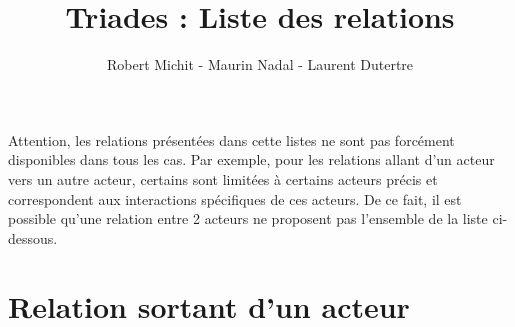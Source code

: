\documentclass[8pt,a4paper]{article}
\title{Triades : Liste des relations}
\author{Robert Michit - Maurin Nadal - Laurent Dutertre}
\begin{document}
\maketitle

\tableofcontents 
\vspace{30 pt}

Attention, les relations présentées dans cette listes ne sont pas forcément disponibles dans tous les cas. Par exemple, pour les relations allant d'un acteur vers un autre acteur, certains sont limitées à certains acteurs précis et correspondent aux interactions spécifiques de ces acteurs. De ce fait, il est possible qu'une relation entre 2 acteurs ne proposent pas l'ensemble de la liste ci-dessous.


\section{Relation sortant d'un acteur}
\end{document}
